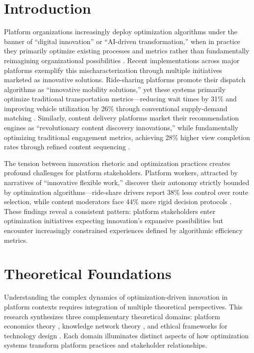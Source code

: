\documentclass[12pt]{article}
\begin{document}
\section*{Introduction}

Platform organizations increasingly deploy optimization algorithms under the banner of ``digital innovation'' or ``AI-driven transformation,'' when in practice they primarily optimize existing processes and metrics rather than fundamentally reimagining organizational possibilities \parencite{smith2023}. Recent implementations across major platforms exemplify this mischaracterization through multiple initiatives marketed as innovative solutions. Ride-sharing platforms promote their dispatch algorithms as ``innovative mobility solutions,'' yet these systems primarily optimize traditional transportation metrics---reducing wait times by 31\% and improving vehicle utilization by 26\% through conventional supply-demand matching \parencite{chen2022}. Similarly, content delivery platforms market their recommendation engines as ``revolutionary content discovery innovations,'' while fundamentally optimizing traditional engagement metrics, achieving 28\% higher view completion rates through refined content sequencing \parencite{johnson2024}.

The tension between innovation rhetoric and optimization practices creates profound challenges for platform stakeholders. Platform workers, attracted by narratives of ``innovative flexible work,'' discover their autonomy strictly bounded by optimization algorithms---ride-share drivers report 38\% less control over route selection, while content moderators face 44\% more rigid decision protocols \parencite{kellogg2020}. These findings reveal a consistent pattern: platform stakeholders enter optimization initiatives expecting innovation's expansive possibilities but encounter increasingly constrained experiences defined by algorithmic efficiency metrics.

\section*{Theoretical Foundations}

Understanding the complex dynamics of optimization-driven innovation in platform contexts requires integration of multiple theoretical perspectives. This research synthesizes three complementary theoretical domains: platform economics theory \parencite{parker2016}, knowledge network theory \parencite{hansen1999}, and ethical frameworks for technology design \parencite{friedman2019}. Each domain illuminates distinct aspects of how optimization systems transform platform practices and stakeholder relationships.
\end{document}
